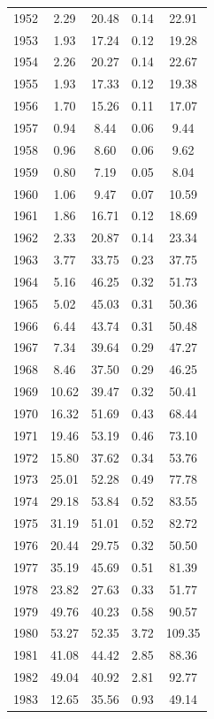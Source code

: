 \documentclass[12pt,]{article}
\begin{document}
\begin{longtable}{ccccc}
  1952 & 2.29 & 20.48 & 0.14 & 22.91 \\ 
  1953 & 1.93 & 17.24 & 0.12 & 19.28 \\ 
  1954 & 2.26 & 20.27 & 0.14 & 22.67 \\ 
  1955 & 1.93 & 17.33 & 0.12 & 19.38 \\ 
  1956 & 1.70 & 15.26 & 0.11 & 17.07 \\ 
  1957 & 0.94 & 8.44 & 0.06 & 9.44 \\ 
  1958 & 0.96 & 8.60 & 0.06 & 9.62 \\ 
  1959 & 0.80 & 7.19 & 0.05 & 8.04 \\ 
  1960 & 1.06 & 9.47 & 0.07 & 10.59 \\ 
  1961 & 1.86 & 16.71 & 0.12 & 18.69 \\ 
  1962 & 2.33 & 20.87 & 0.14 & 23.34 \\ 
  1963 & 3.77 & 33.75 & 0.23 & 37.75 \\ 
  1964 & 5.16 & 46.25 & 0.32 & 51.73 \\ 
  1965 & 5.02 & 45.03 & 0.31 & 50.36 \\ 
  1966 & 6.44 & 43.74 & 0.31 & 50.48 \\ 
  1967 & 7.34 & 39.64 & 0.29 & 47.27 \\ 
  1968 & 8.46 & 37.50 & 0.29 & 46.25 \\ 
  1969 & 10.62 & 39.47 & 0.32 & 50.41 \\ 
  1970 & 16.32 & 51.69 & 0.43 & 68.44 \\ 
  1971 & 19.46 & 53.19 & 0.46 & 73.10 \\ 
  1972 & 15.80 & 37.62 & 0.34 & 53.76 \\ 
  1973 & 25.01 & 52.28 & 0.49 & 77.78 \\ 
  1974 & 29.18 & 53.84 & 0.52 & 83.55 \\ 
  1975 & 31.19 & 51.01 & 0.52 & 82.72 \\ 
  1976 & 20.44 & 29.75 & 0.32 & 50.50 \\ 
  1977 & 35.19 & 45.69 & 0.51 & 81.39 \\ 
  1978 & 23.82 & 27.63 & 0.33 & 51.77 \\ 
  1979 & 49.76 & 40.23 & 0.58 & 90.57 \\ 
  1980 & 53.27 & 52.35 & 3.72 & 109.35 \\ 
  1981 & 41.08 & 44.42 & 2.85 & 88.36 \\ 
  1982 & 49.04 & 40.92 & 2.81 & 92.77 \\ 
  1983 & 12.65 & 35.56 & 0.93 & 49.14 \\ 

\end{longtable}
\end{document}
